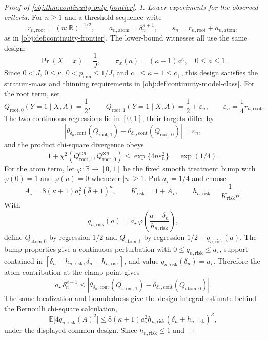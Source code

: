 \begin{proof}[Proof of \cref{obj:thm:continuity-only-frontier}]
\emph{1. Lower experiments for the observed criteria.}
For \(n\geq1\) and a threshold sequence write
\[
r_{n,\mathrm{root}}=(n:\mathbb R)^{-1/2},
\qquad
a_{n,\mathrm{atom}}=\delta_n^{\kappa+1},
\qquad
s_n=r_{n,\mathrm{root}}+a_{n,\mathrm{atom}},
\]
as in \cref{obj:def:continuity-frontier}.  The lower-bound witnesses all use the same design:
\[
\Pr(X=x)=\frac1J,\qquad
\pi_x(a)=(\kappa+1)a^\kappa,\quad 0\leq a\leq1 .
\]
Since \(0<J\), \(0\leq\kappa\), \(0<p_{\min}\leq1/J\), and
\(c_-\leq\kappa+1\leq c_+\), this design satisfies the stratum-mass and thinning requirements in
\cref{obj:def:continuity-model-class}.  For the root term, set
\[
Q_{\mathrm{root},0}(Y=1\mid X,A)=\frac12,\qquad
Q_{\mathrm{root},1}(Y=1\mid X,A)=\frac12+\varepsilon_n,
\qquad
\varepsilon_n=\frac14 r_{n,\mathrm{root}} .
\]
The two continuous regressions lie in \([0,1]\), their targets differ by
\[
\left|
\theta_{\delta_n,\mathrm{cont}}(Q_{\mathrm{root},1})
-\theta_{\delta_n,\mathrm{cont}}(Q_{\mathrm{root},0})
\right|
=\varepsilon_n,
\]
and the product chi-square divergence obeys
\[
1+\chi^2(Q_{\mathrm{root},1}^{\otimes n},Q_{\mathrm{root},0}^{\otimes n})
\leq \exp\{4n\varepsilon_n^2\}=\exp(1/4).
\]
For the atom term, let \(\varphi:\mathbb R\to[0,1]\) be the fixed smooth treatment bump with
\(\varphi(0)=1\) and \(\varphi(u)=0\) whenever \(|u|\geq1\).  Put \(a_\star=1/4\) and choose
\[
A_\star=8(\kappa+1)a_\star^2(\bar\delta+1)^\kappa,
\qquad
K_{\mathrm{risk}}=1+A_\star,
\qquad
h_{n,\mathrm{risk}}=\frac1{K_{\mathrm{risk}}n}.
\]
With
\[
q_{n,\mathrm{risk}}(a)=a_\star\,
\varphi\!\left(\frac{a-\delta_n}{h_{n,\mathrm{risk}}}\right),
\]
define \(Q_{\mathrm{atom},0}\) by regression \(1/2\) and \(Q_{\mathrm{atom},1}\) by regression
\(1/2+q_{n,\mathrm{risk}}(a)\).  The bump properties give a continuous perturbation with
\(0\leq q_{n,\mathrm{risk}}\leq a_\star\), support contained in
\([\delta_n-h_{n,\mathrm{risk}},\delta_n+h_{n,\mathrm{risk}}]\), and value
\(q_{n,\mathrm{risk}}(\delta_n)=a_\star\).  Therefore the atom contribution at the clamp point gives
\[
a_\star\,\delta_n^{\kappa+1}
\leq
\left|
\theta_{\delta_n,\mathrm{cont}}(Q_{\mathrm{atom},1})
-\theta_{\delta_n,\mathrm{cont}}(Q_{\mathrm{atom},0})
\right|.
\]
The same localization and boundedness give the design-integral estimate behind the Bernoulli
chi-square calculation,
\[
\mathbb E\!\bigl[4q_{n,\mathrm{risk}}(A)^2\bigr]
\leq
8(\kappa+1)a_\star^2h_{n,\mathrm{risk}}
(\delta_n+h_{n,\mathrm{risk}})^\kappa,
\]
under the displayed common design.  Since \(h_{n,\mathrm{risk}}\leq1\) and

\end{proof}
